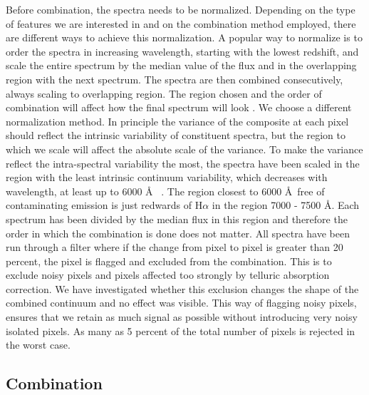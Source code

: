 \documentclass{aa}    %
\newcommand{\sectlabel}[1]{\label{sect:#1}}
\begin{document}
Before combination, the spectra needs to be normalized. Depending on the type of features we are interested in and
on the combination method employed, there are different ways to
achieve this normalization. A popular way to normalize is to order the
spectra in increasing wavelength, starting with the lowest redshift,
and scale the entire spectrum by the median value of the flux and in
the overlapping region with the next spectrum. The spectra are then
combined consecutively, always scaling to overlapping region. The
region chosen and the order of combination will affect how the final
spectrum will look
\citep{Francis1991,Brotherton2000,VandenBerk2001,Glikman2006}. We
choose a different normalization method. In principle the variance of
the composite at each pixel should reflect the intrinsic variability of constituent
spectra, but the region to which we scale will affect the absolute
scale of the variance. To make the variance reflect the intra-spectral
variability the most, the spectra have been scaled in the region with
the least intrinsic continuum variability, which decreases with
wavelength, at least up to 6000 \AA~ \citep{VandenBerk2004}. The
region closest to 6000 \AA~free of contaminating emission is just
redwards of H$\alpha$ in the region 7000 - 7500 \AA. Each spectrum has
been divided by the median flux in this region and therefore the order in which the combination is done does not
matter.  All spectra have been run
through a filter where if the change from pixel to pixel is greater
than 20 percent, the pixel is flagged and excluded from the
combination. This is to exclude noisy pixels and pixels affected too
strongly by telluric absorption correction. We have investigated
whether this exclusion changes the shape of the combined continuum and
no effect was visible. This way of flagging noisy pixels, ensures that
we retain as much signal as possible without introducing very noisy
isolated pixels. As many as 5 percent of the total number of pixels is
rejected in the worst case.

\subsection{Combination}  \sectlabel{combine}
\end{document}
